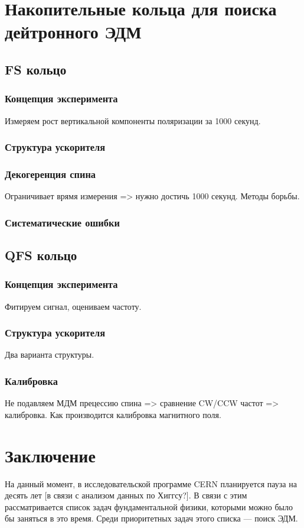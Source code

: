 \documentclass{extarticle}
\begin{document}
\section{Накопительные кольца для поиска дейтронного ЭДМ}
\subsection{FS кольцо}
	\subsubsection{Концепция эксперимента}
		Измеряем рост вертикальной компоненты поляризации за 1000 секунд.
	\subsubsection{Структура ускорителя}
	\subsubsection{Декогеренция спина}
		Ограничивает врямя измерения => нужно достичь 1000 секунд. Методы борьбы.
	\subsubsection{Систематические ошибки}
\subsection{QFS кольцо}
	\subsubsection{Концепция эксперимента}
		Фитируем сигнал, оцениваем частоту.
	\subsubsection{Структура ускорителя}
		Два варианта структуры.
	\subsubsection{Калибровка}
		Не подавляем МДМ прецессию спина => сравнение CW/CCW частот => калибровка. Как производится калибровка магнитного поля.
		
\section*{Заключение}
На данный момент, в исследовательской программе CERN планируется пауза на десять лет [в связи с анализом данных по Хиггсу?]. В связи с этим рассматривается список задач фундаментальной физики, которыми можно было бы заняться в это время. Среди приоритетных задач этого списка --- поиск ЭДМ. 
\end{document}
